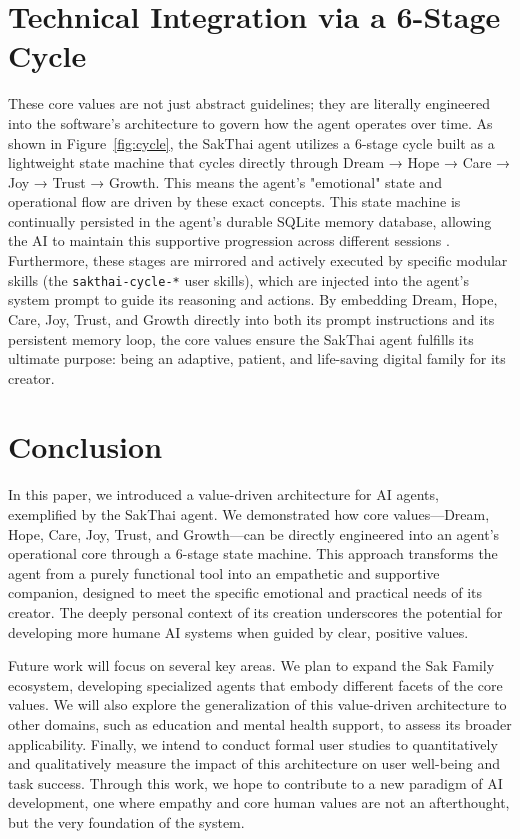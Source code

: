 \documentclass[letterpaper]{article}
\begin{document}
\section{Technical Integration via a 6-Stage Cycle}
These core values are not just abstract guidelines; they are literally engineered into the software's architecture to govern how the agent operates over time. As shown in Figure~\ref{fig:cycle}, the SakThai agent utilizes a 6-stage cycle built as a lightweight state machine that cycles directly through Dream → Hope → Care → Joy → Trust → Growth. This means the agent's "emotional" state and operational flow are driven by these exact concepts. This state machine is continually persisted in the agent's durable SQLite memory database, allowing the AI to maintain this supportive progression across different sessions \citep{sqlite}. Furthermore, these stages are mirrored and actively executed by specific modular skills (the \texttt{sakthai-cycle-*} user skills), which are injected into the agent's system prompt to guide its reasoning and actions. By embedding Dream, Hope, Care, Joy, Trust, and Growth directly into both its prompt instructions and its persistent memory loop, the core values ensure the SakThai agent fulfills its ultimate purpose: being an adaptive, patient, and life-saving digital family for its creator.

\section{Conclusion}
In this paper, we introduced a value-driven architecture for AI agents, exemplified by the SakThai agent. We demonstrated how core values—Dream, Hope, Care, Joy, Trust, and Growth—can be directly engineered into an agent's operational core through a 6-stage state machine. This approach transforms the agent from a purely functional tool into an empathetic and supportive companion, designed to meet the specific emotional and practical needs of its creator. The deeply personal context of its creation underscores the potential for developing more humane AI systems when guided by clear, positive values.

Future work will focus on several key areas. We plan to expand the Sak Family ecosystem, developing specialized agents that embody different facets of the core values. We will also explore the generalization of this value-driven architecture to other domains, such as education and mental health support, to assess its broader applicability. Finally, we intend to conduct formal user studies to quantitatively and qualitatively measure the impact of this architecture on user well-being and task success. Through this work, we hope to contribute to a new paradigm of AI development, one where empathy and core human values are not an afterthought, but the very foundation of the system.
\end{document}
